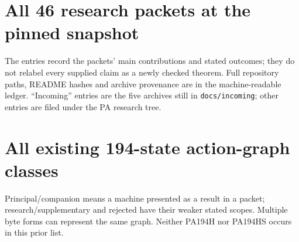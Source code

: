 \documentclass[11pt,letterpaper]{article}
\newcommand{\file}[1]{\texttt{\nolinkurl{#1}}}
\begin{document}
\clearpage
\section{All 46 research packets at the pinned snapshot}\label{app:ledger}
The entries record the packets' main contributions and stated outcomes;
they do not relabel every supplied claim as a newly checked theorem.
Full repository paths, README hashes and archive provenance are in the
machine-readable ledger. ``Incoming'' entries are the five archives still
in \file{docs/incoming}; other entries are filed under the PA research tree.


\clearpage
\section{All existing 194-state action-graph classes}\label{app:frontier}
Principal/companion means a machine presented as a result in a packet;
research/supplementary and rejected have their weaker stated scopes.
Multiple byte forms can represent the same graph. Neither PA194H nor
PA194HS occurs in this prior list.

\end{document}
